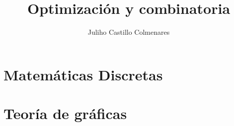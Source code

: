 \documentclass[
twoside,
12pt,
letterpaper, 
justified
]{tufte-book}
\title{Optimización y combinatoria}
\author[J. Castillo]{Juliho Castillo Colmenares}
\begin{document}
	\maketitle
	\tableofcontents

\chapter{Matemáticas Discretas}





\chapter{Teoría de gráficas}




{}

\end{document}
